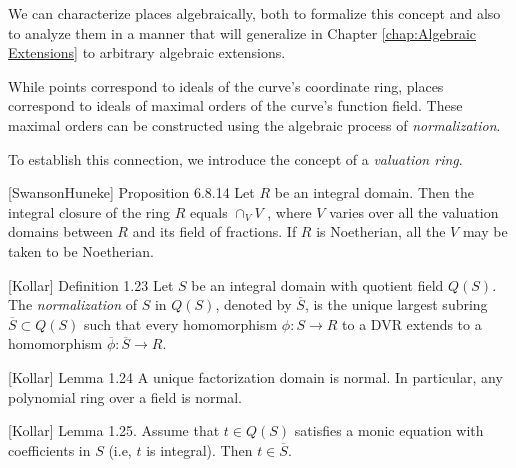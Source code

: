 \begin{comment}
# for f in test_curves:
#     analyze_multiple_points(f)
\end{sageblock}


$$y^3 - 3axy + x^3$$

This function contains an extra variable and is, in fact, a family of
algebraic curves.

\endexample

\end{comment}


\vfill\eject
{}

We can characterize places algebraically, both to formalize this
concept and also to analyze them in a manner that will generalize
in Chapter \ref{chap:Algebraic Extensions} to arbitrary algebraic extensions.

While points correspond to ideals of the curve's coordinate ring,
places correspond to ideals of maximal orders of the curve's
function field.  These maximal orders can be constructed
using the algebraic process of {\it normalization}.

To establish this connection, we introduce the concept of a
{\it valuation ring}.


[SwansonHuneke] Proposition 6.8.14 Let $R$ be an integral domain. Then
the integral closure of the ring $R$ equals $\cap_V V$ , where $V$
varies over all the valuation domains between $R$ and its field of
fractions. If $R$ is Noetherian, all the $V$ may be taken to be
Noetherian.

[Kollar] Definition 1.23
Let $S$ be an integral domain with quotient field $Q(S)$.
The {\it normalization} of $S$ in $Q(S)$, denoted by $\overline{S}$,
is the unique largest subring $\overline{S} \subset Q(S)$
such that every homomorphism $\phi: S \to R$ to a DVR
extends to a homomorphism $\overline{\phi}: \overline{S} \to R$.

[Kollar] Lemma 1.24
A unique factorization domain is normal.  In particular,
any polynomial ring over a field is normal.

[Kollar] Lemma 1.25.
Assume that $t \in Q(S)$ satisfies a monic equation
with coefficients in $S$ (i.e, $t$ is integral).
Then $t \in \overline{S}$.

